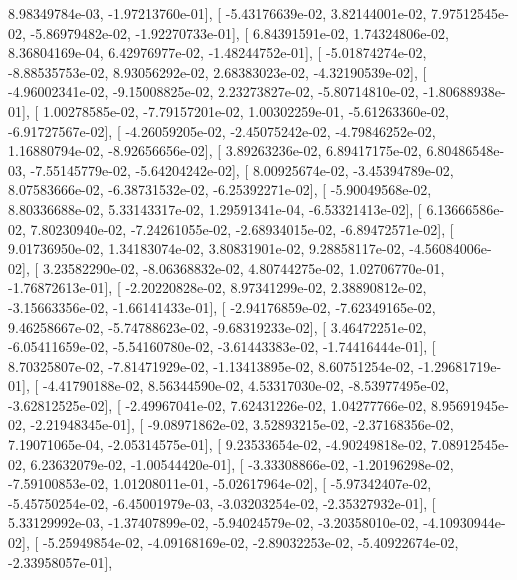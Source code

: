 \documentclass{article}
\begin{document}
          8.98349784e-03,  -1.97213760e-01],
       [ -5.43176639e-02,   3.82144001e-02,   7.97512545e-02,
         -5.86979482e-02,  -1.92270733e-01],
       [  6.84391591e-02,   1.74324806e-02,   8.36804169e-04,
          6.42976977e-02,  -1.48244752e-01],
       [ -5.01874274e-02,  -8.88535753e-02,   8.93056292e-02,
          2.68383023e-02,  -4.32190539e-02],
       [ -4.96002341e-02,  -9.15008825e-02,   2.23273827e-02,
         -5.80714810e-02,  -1.80688938e-01],
       [  1.00278585e-02,  -7.79157201e-02,   1.00302259e-01,
         -5.61263360e-02,  -6.91727567e-02],
       [ -4.26059205e-02,  -2.45075242e-02,  -4.79846252e-02,
          1.16880794e-02,  -8.92656656e-02],
       [  3.89263236e-02,   6.89417175e-02,   6.80486548e-03,
         -7.55145779e-02,  -5.64204242e-02],
       [  8.00925674e-02,  -3.45394789e-02,   8.07583666e-02,
         -6.38731532e-02,  -6.25392271e-02],
       [ -5.90049568e-02,   8.80336688e-02,   5.33143317e-02,
          1.29591341e-04,  -6.53321413e-02],
       [  6.13666586e-02,   7.80230940e-02,  -7.24261055e-02,
         -2.68934015e-02,  -6.89472571e-02],
       [  9.01736950e-02,   1.34183074e-02,   3.80831901e-02,
          9.28858117e-02,  -4.56084006e-02],
       [  3.23582290e-02,  -8.06368832e-02,   4.80744275e-02,
          1.02706770e-01,  -1.76872613e-01],
       [ -2.20220828e-02,   8.97341299e-02,   2.38890812e-02,
         -3.15663356e-02,  -1.66141433e-01],
       [ -2.94176859e-02,  -7.62349165e-02,   9.46258667e-02,
         -5.74788623e-02,  -9.68319233e-02],
       [  3.46472251e-02,  -6.05411659e-02,  -5.54160780e-02,
         -3.61443383e-02,  -1.74416444e-01],
       [  8.70325807e-02,  -7.81471929e-02,  -1.13413895e-02,
          8.60751254e-02,  -1.29681719e-01],
       [ -4.41790188e-02,   8.56344590e-02,   4.53317030e-02,
         -8.53977495e-02,  -3.62812525e-02],
       [ -2.49967041e-02,   7.62431226e-02,   1.04277766e-02,
          8.95691945e-02,  -2.21948345e-01],
       [ -9.08971862e-02,   3.52893215e-02,  -2.37168356e-02,
          7.19071065e-04,  -2.05314575e-01],
       [  9.23533654e-02,  -4.90249818e-02,   7.08912545e-02,
          6.23632079e-02,  -1.00544420e-01],
       [ -3.33308866e-02,  -1.20196298e-02,  -7.59100853e-02,
          1.01208011e-01,  -5.02617964e-02],
       [ -5.97342407e-02,  -5.45750254e-02,  -6.45001979e-03,
         -3.03203254e-02,  -2.35327932e-01],
       [  5.33129992e-03,  -1.37407899e-02,  -5.94024579e-02,
         -3.20358010e-02,  -4.10930944e-02],
       [ -5.25949854e-02,  -4.09168169e-02,  -2.89032253e-02,
         -5.40922674e-02,  -2.33958057e-01],
\end{document}
